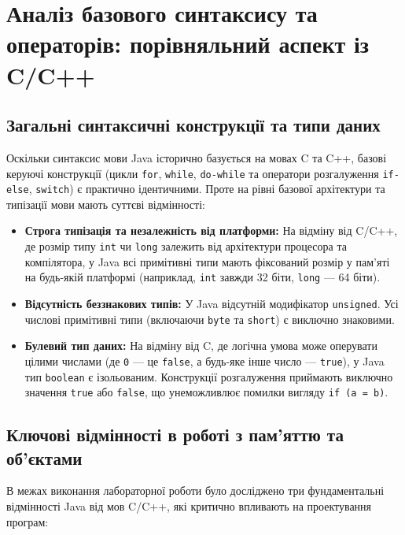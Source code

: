\section{Аналіз базового синтаксису та операторів: порівняльний аспект із C/C++}

\subsection{Загальні синтаксичні конструкції та типи даних}

Оскільки синтаксис мови Java історично базується на мовах C та C++, базові керуючі 
конструкції (цикли \texttt{for}, \texttt{while}, \texttt{do-while} та оператори 
розгалуження \texttt{if-else}, \texttt{switch}) є практично ідентичними. Проте на 
рівні базової архітектури та типізації мови мають суттєві відмінності:

\begin{itemize}
    \item \textbf{Строга типізація та незалежність від платформи:} 
    На відміну від C/C++,  де розмір типу \texttt{int} чи \texttt{long} залежить 
    від архітектури процесора та компілятора, у Java всі примітивні типи мають фіксований 
    розмір у пам'яті на будь-якій платформі (наприклад, \texttt{int} завжди 32 біти, \texttt{long} — 64 біти).
    \item \textbf{Відсутність беззнакових типів:} 
    У Java відсутній модифікатор \texttt{unsigned}. Усі числові примітивні 
    типи (включаючи \texttt{byte} та \texttt{short}) є виключно знаковими.
    \item \textbf{Булевий тип даних:} 
    На відміну від C, де логічна умова може оперувати цілими числами (де \texttt{0} — це \texttt{false}, 
    а будь-яке інше число — \texttt{true}), у Java тип \texttt{boolean} є ізольованим. Конструкції 
    розгалуження приймають виключно значення \texttt{true} або \texttt{false}, що унеможливлює помилки 
    вигляду \texttt{if (a = b)}.
\end{itemize}

\subsection{Ключові відмінності в роботі з пам'яттю та об'єктами}

В межах виконання лабораторної роботи було досліджено три фундаментальні відмінності Java від мов C/C++, 
які критично впливають на проектування програм:

